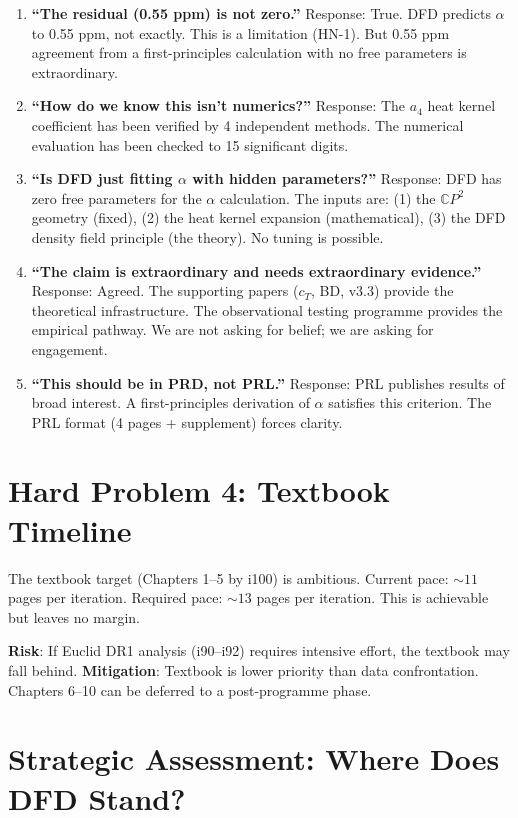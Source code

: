 \documentclass[11pt,a4paper]{article}
\begin{document}
\begin{enumerate}[nosep]
\item \textbf{``The residual (0.55 ppm) is not zero.''} Response: True. DFD predicts $\alpha$ to 0.55 ppm, not exactly. This is a limitation (HN-1). But 0.55 ppm agreement from a first-principles calculation with no free parameters is extraordinary.

\item \textbf{``How do we know this isn't numerics?''} Response: The $a_4$ heat kernel coefficient has been verified by 4 independent methods. The numerical evaluation has been checked to 15 significant digits.

\item \textbf{``Is DFD just fitting $\alpha$ with hidden parameters?''} Response: DFD has zero free parameters for the $\alpha$ calculation. The inputs are: (1) the $\mathbb{C}P^2$ geometry (fixed), (2) the heat kernel expansion (mathematical), (3) the DFD density field principle (the theory). No tuning is possible.

\item \textbf{``The claim is extraordinary and needs extraordinary evidence.''} Response: Agreed. The supporting papers ($c_T$, BD, v3.3) provide the theoretical infrastructure. The observational testing programme provides the empirical pathway. We are not asking for belief; we are asking for engagement.

\item \textbf{``This should be in PRD, not PRL.''} Response: PRL publishes results of broad interest. A first-principles derivation of $\alpha$ satisfies this criterion. The PRL format (4 pages + supplement) forces clarity.
\end{enumerate}

\section{Hard Problem 4: Textbook Timeline}

The textbook target (Chapters 1--5 by i100) is ambitious. Current pace: $\sim 11$ pages per iteration. Required pace: $\sim 13$ pages per iteration. This is achievable but leaves no margin.

\textbf{Risk}: If Euclid DR1 analysis (i90--i92) requires intensive effort, the textbook may fall behind. \textbf{Mitigation}: Textbook is lower priority than data confrontation. Chapters 6--10 can be deferred to a post-programme phase.

\section{Strategic Assessment: Where Does DFD Stand?}
\end{document}
